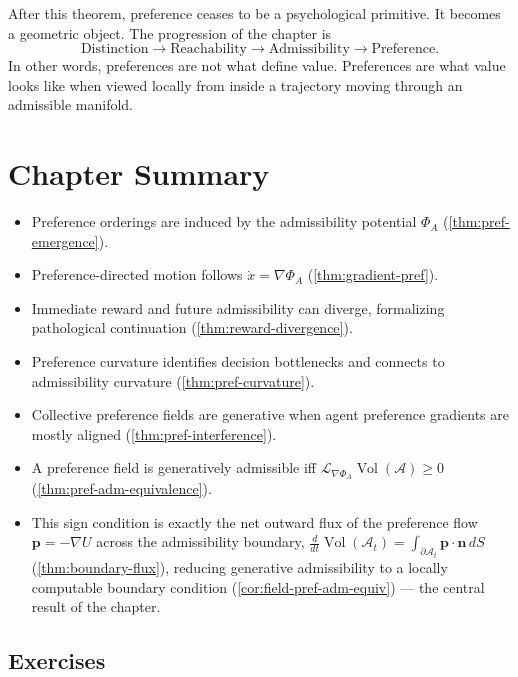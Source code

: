 \documentclass[12pt,twoside,openright]{book}
\newcommand{\adm}{\mathcal{A}}
\newcommand{\Vol}{\operatorname{Vol}}
\newenvironment{chapsummary}{%
  \begin{tcolorbox}[colback=DistBlue!5,colframe=DistBlue,
    title={\faBookOpen\enspace Summary},
    fonttitle=\sffamily\bfseries\color{white},
    attach boxed title to top left={yshift=-2mm,xshift=4mm},
    boxed title style={colback=DistBlue,rounded corners}]
  \begin{itemize}[nosep,leftmargin=*]}{%
  \end{itemize}\end{tcolorbox}}
\begin{document}
After this theorem, preference ceases to be a psychological
primitive. It becomes a geometric object. The progression
of the chapter is
\[
  \text{Distinction} \to \text{Reachability}
  \to \text{Admissibility} \to \text{Preference}.
\]
In other words, preferences are not what define value.
Preferences are what value looks like when viewed locally
from inside a trajectory moving through an admissible
manifold.

\section*{Chapter Summary}
\begin{chapsummary}
  \item Preference orderings are induced by the
        admissibility potential $\Phi_A$
        (\cref{thm:pref-emergence}).
  \item Preference-directed motion follows
        $\dot{x} = \nabla\Phi_A$
        (\cref{thm:gradient-pref}).
  \item Immediate reward and future admissibility can
        diverge, formalizing pathological continuation
        (\cref{thm:reward-divergence}).
  \item Preference curvature identifies decision
        bottlenecks and connects to admissibility curvature
        (\cref{thm:pref-curvature}).
  \item Collective preference fields are generative when
        agent preference gradients are mostly aligned
        (\cref{thm:pref-interference}).
  \item A preference field is generatively admissible iff
        $\mathcal{L}_{\nabla\Phi_A}\Vol(\adm) \ge 0$
        (\cref{thm:pref-adm-equivalence}).
  \item This sign condition is exactly the net outward flux
        of the preference flow $\mathbf{p}=-\nabla U$ across
        the admissibility boundary,
        $\frac{d}{dt}\Vol(\mathcal{A}_t) =
        \int_{\partial\mathcal{A}_t}\mathbf{p}\cdot\mathbf{n}\,dS$
        (\cref{thm:boundary-flux}), reducing generative
        admissibility to a locally computable boundary
        condition (\cref{cor:field-pref-adm-equiv}) --- the
        central result of the chapter.
\end{chapsummary}

\subsection*{Exercises}
\end{document}

